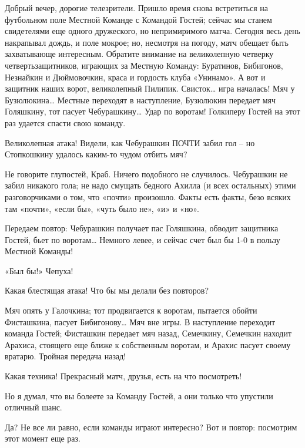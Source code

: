 \documentclass[../main.tex]{subfiles}
\begin{document}
\begin{dialogue}
 Добрый вечер, дорогие телезрители. Пришло время снова встретиться на футбольном поле Местной Команде с Командой Гостей; сейчас мы станем свидетелями еще одного дружеского, но непримиримого матча. Сегодня весь день накрапывал дождь, и поле мокрое; но, несмотря на погоду, матч обещает быть захватывающе интересным. Обратите внимание на великолепную четверку четвертьзащитников, играющих за Местную Команду: Буратинов, Бибигонов, Незнайкин и Дюймовочкин, краса и гордость клуба «Унинамо». А вот и защитник наших ворот, великолепный Пилипик. Свисток\ldots{} игра началась! Мяч у Бузюлюкина\ldots{} Местные переходят в наступление, Бузюлюкин передает мяч Голяшкину, тот пасует Чебурашкину\ldots{} Удар по воротам! Голкиперу Гостей на этот раз удается спасти свою команду.

 Великолепная атака! Видели, как Чебурашкин ПОЧТИ забил гол \--- но Стопкошкину удалось каким-то чудом отбить мяч?

 Не говорите глупостей, Краб. Ничего подобного не случилось. Чебурашкин не забил никакого гола; не надо смущать бедного Ахилла (и всех остальных) этими разговорчиками о том, что «почти» произошло. Факты есть факты, безо всяких там «почти», «если бы», «чуть было не», «и» и «но».

 Передаем повтор: Чебурашкин получает пас Голяшкина, обводит защитника Гостей, бьет по воротам\ldots{} Немного левее, и сейчас счет был бы 1-0 в пользу Местной Команды!

 «Был бы!» Чепуха!

 Какая блестящая атака! Что бы мы делали без повторов?

 Мяч опять у Галочкина; тот продвигается к воротам, пытается обойти Фисташкина, пасует Бибигонову\ldots{} Мяч вне игры. В наступление переходит команда Гостей; Фисташкин передает мяч назад, Семечкину, Семечкин находит Арахиса, стоящего еще ближе к собственным воротам, и Арахис пасует своему вратарю. Тройная передача назад!

 Какая техника! Прекрасный матч, друзья, есть на что посмотреть!

 Но я думал, что вы болеете за Команду Гостей, а они только что упустили отличный шанс.

 Да? Не все ли равно, если команды играют интересно? Вот и повтор: посмотрим этот момент еще раз.



\end{dialogue}
\end{document}
